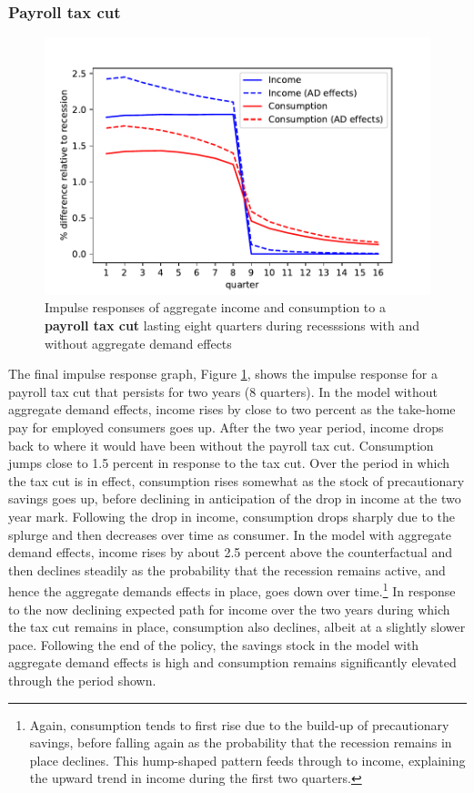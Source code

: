 \documentclass[../HAFiscal]{subfiles}
\begin{document}
\subsubsection{Payroll tax cut}

\begin{figure}
	\centering
	\includegraphics[width=0.8\linewidth]{Code/HA-Models/FromPandemicCode/Figures/recession_taxcut_relrecession}
	\caption{Impulse responses of aggregate income and consumption to a \textbf{payroll tax cut} lasting eight quarters during recesssions with and without aggregate demand effects}
	\label{fig:recessiontaxcutrelrecession}
\end{figure}

The final impulse response graph, Figure \ref{fig:recessiontaxcutrelrecession}, shows the impulse response for a payroll tax cut that persists for two years (8 quarters). In the model without aggregate demand effects, income rises by close to two percent as the take-home pay for employed consumers goes up. After the two year period, income drops back to where it would have been without the payroll tax cut. Consumption jumps close to 1.5 percent in response to the tax cut. Over the period in which the tax cut is in effect, consumption rises somewhat as the stock of precautionary savings goes up, before declining in anticipation of the drop in income at the two year mark. Following the drop in income, consumption drops sharply due to the splurge and then decreases over time as consumer. In the model with aggregate demand effects, income rises by about 2.5 percent above the counterfactual and then declines steadily as the probability that the recession remains active, and hence the aggregate demands effects in place, goes down over time.\footnote{Again, consumption tends to first rise due to the build-up of precautionary savings, before falling again as the probability that the recession remains in place declines. This hump-shaped pattern feeds through to income, explaining the upward trend in income during the first two quarters.} In response to the now declining expected path for income over the two years during which the tax cut remains in place, consumption also declines, albeit at a slightly slower pace. Following the end of the policy, the savings stock in the model with aggregate demand effects is high and consumption remains significantly elevated through the period shown.
\end{document}
